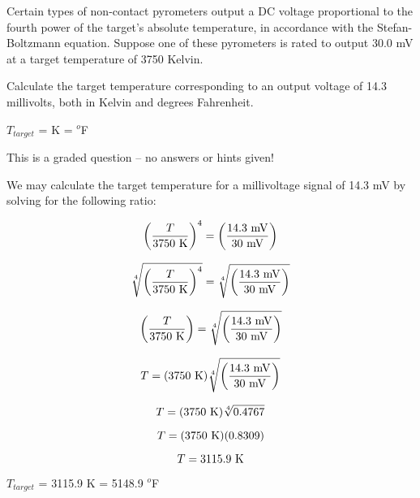 

Certain types of non-contact pyrometers output a DC voltage proportional to the fourth power of the target's absolute temperature, in accordance with the Stefan-Boltzmann equation.  Suppose one of these pyrometers is rated to output 30.0 mV at a target temperature of 3750 Kelvin.

Calculate the target temperature corresponding to an output voltage of 14.3 millivolts, both in Kelvin and degrees Fahrenheit.

\vskip 10pt

$T_{target}$ = \underbar{\hskip 50pt} K = \underbar{\hskip 50pt} $^{o}$F

\vfil 

\eject






This is a graded question -- no answers or hints given!







We may calculate the target temperature for a millivoltage signal of 14.3 mV by solving for the following ratio:

$$\left(T \over 3750 \hbox{ K} \right)^4 = \left(14.3 \hbox{ mV} \over 30 \hbox{ mV}  \right)$$

$$\root 4 \of {\left(T \over 3750 \hbox{ K} \right)^4} = \root 4 \of {\left(14.3 \hbox{ mV} \over 30 \hbox{ mV}  \right)}$$

$$\left(T \over 3750 \hbox{ K} \right) = \root 4 \of {\left(14.3 \hbox{ mV} \over 30 \hbox{ mV}  \right)}$$

$$T = (3750 \hbox{ K}) \root 4 \of {\left(14.3 \hbox{ mV} \over 30 \hbox{ mV} \right)}$$

$$T = (3750 \hbox{ K}) \root 4 \of {0.4767}$$

$$T = (3750 \hbox{ K}) (0.8309)$$

$$T = 3115.9 \hbox{ K}$$

$T_{target}$ = 3115.9 K = 5148.9 $^{o}$F





